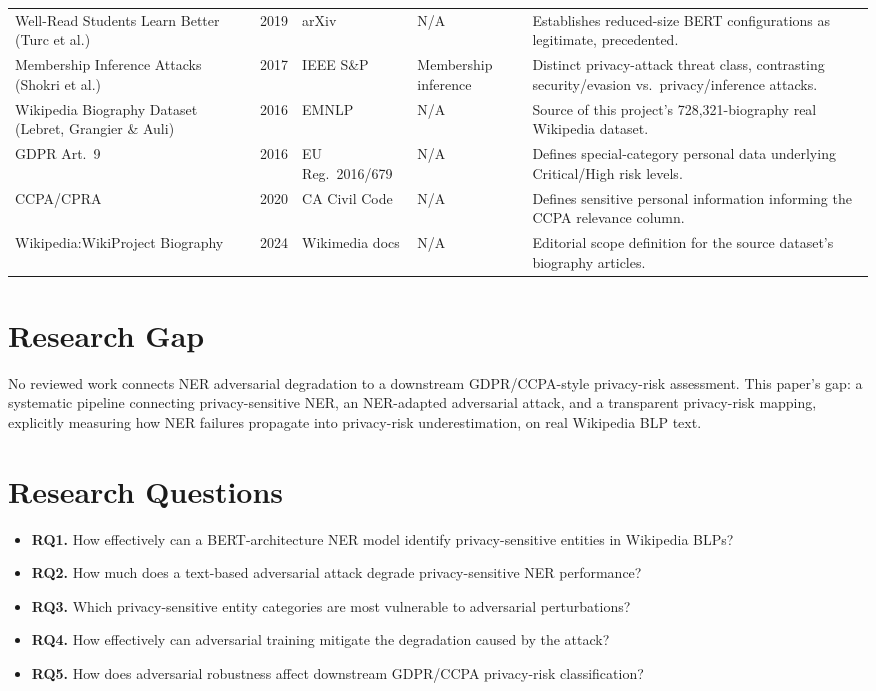 \documentclass[conference]{IEEEtran}
\begin{document}
\begin{table}[!ht]
\begin{tabular}{p{3.3cm}p{0.5cm}p{1.6cm}p{2.7cm}p{7.5cm}}
Well-Read Students Learn Better (Turc et al.) & 2019 & arXiv & N/A & Establishes reduced-size BERT configurations as legitimate, precedented. \\
Membership Inference Attacks (Shokri et al.) & 2017 & IEEE S\&P & Membership inference & Distinct privacy-attack threat class, contrasting security/evasion vs.\ privacy/inference attacks. \\
Wikipedia Biography Dataset (Lebret, Grangier \& Auli) & 2016 & EMNLP & N/A & Source of this project's 728,321-biography real Wikipedia dataset. \\
GDPR Art.~9 & 2016 & EU Reg.\ 2016/679 & N/A & Defines special-category personal data underlying Critical/High risk levels. \\
CCPA/CPRA & 2020 & CA Civil Code & N/A & Defines sensitive personal information informing the CCPA relevance column. \\
Wikipedia:WikiProject Biography & 2024 & Wikimedia docs & N/A & Editorial scope definition for the source dataset's biography articles. \\
\bottomrule
\end{tabular}
\end{table}

\section{Research Gap}
No reviewed work connects NER adversarial degradation to a downstream GDPR/CCPA-style privacy-risk assessment. This paper's gap: a systematic pipeline connecting privacy-sensitive NER, an NER-adapted adversarial attack, and a transparent privacy-risk mapping, explicitly measuring how NER failures propagate into privacy-risk underestimation, on real Wikipedia BLP text.

\section{Research Questions}
\begin{itemize}
\item \textbf{RQ1.} How effectively can a BERT-architecture NER model identify privacy-sensitive entities in Wikipedia BLPs?
\item \textbf{RQ2.} How much does a text-based adversarial attack degrade privacy-sensitive NER performance?
\item \textbf{RQ3.} Which privacy-sensitive entity categories are most vulnerable to adversarial perturbations?
\item \textbf{RQ4.} How effectively can adversarial training mitigate the degradation caused by the attack?
\item \textbf{RQ5.} How does adversarial robustness affect downstream GDPR/CCPA privacy-risk classification?
\end{itemize}
\end{document}
